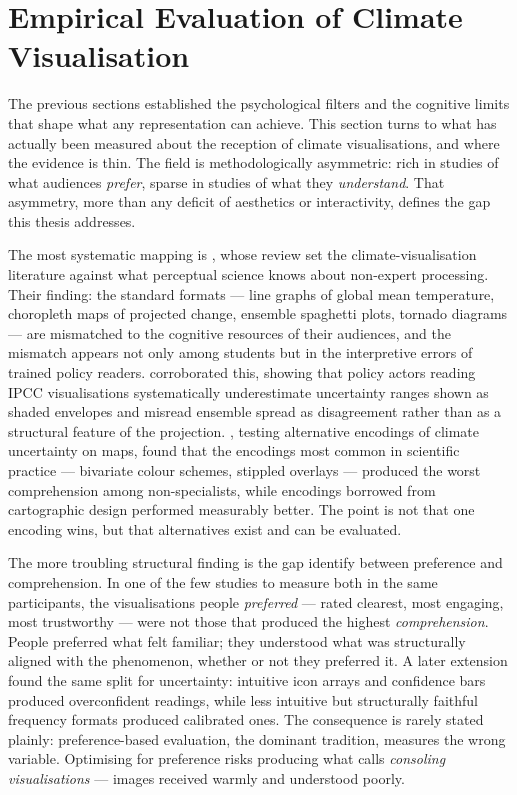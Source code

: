 \section{Empirical Evaluation of Climate Visualisation}
\label{sec:empirical-viz}

The previous sections established the psychological filters and the cognitive limits that shape what any representation can achieve. This section turns to what has actually been measured about the reception of climate visualisations, and where the evidence is thin. The field is methodologically asymmetric: rich in studies of what audiences \emph{prefer}, sparse in studies of what they \emph{understand}. That asymmetry, more than any deficit of aesthetics or interactivity, defines the gap this thesis addresses.

The most systematic mapping is \citet{harold2016}, whose review set the climate-visualisation literature against what perceptual science knows about non-expert processing. Their finding: the standard formats --- line graphs of global mean temperature, choropleth maps of projected change, ensemble spaghetti plots, tornado diagrams --- are mismatched to the cognitive resources of their audiences, and the mismatch appears not only among students but in the interpretive errors of trained policy readers. \citet{mcmahon2015} corroborated this, showing that policy actors reading IPCC visualisations systematically underestimate uncertainty ranges shown as shaded envelopes and misread ensemble spread as disagreement rather than as a structural feature of the projection. \citet{retchless2016}, testing alternative encodings of climate uncertainty on maps, found that the encodings most common in scientific practice --- bivariate colour schemes, stippled overlays --- produced the worst comprehension among non-specialists, while encodings borrowed from cartographic design performed measurably better. The point is not that one encoding wins, but that alternatives exist and can be evaluated.

The more troubling structural finding is the gap \citet{kause2020} identify between preference and comprehension. In one of the few studies to measure both in the same participants, the visualisations people \emph{preferred} --- rated clearest, most engaging, most trustworthy --- were not those that produced the highest \emph{comprehension}. People preferred what felt familiar; they understood what was structurally aligned with the phenomenon, whether or not they preferred it. A later extension \citep{kause2021} found the same split for uncertainty: intuitive icon arrays and confidence bars produced overconfident readings, while less intuitive but structurally faithful frequency formats produced calibrated ones. The consequence is rarely stated plainly: preference-based evaluation, the dominant tradition, measures the wrong variable. Optimising for preference risks producing what \citet{sheppard2015} calls \emph{consoling visualisations} --- images received warmly and understood poorly.

